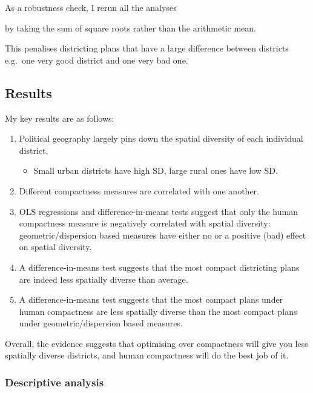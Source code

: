 \documentclass[]{article}
\providecommand{\tightlist}{%
  \setlength{\itemsep}{0pt}\setlength{\parskip}{0pt}}
\begin{document}
As a robustness check, I rerun all the analyses

by taking the sum of square roots rather than the arithmetic mean.

This penalises districting plans that have a large difference between
districts e.g.~one very good district and one very bad one.

\hypertarget{results}{%
\subsection{Results}\label{results}}

My key results are as follows:

\begin{enumerate}
\def\labelenumi{\arabic{enumi}.}
\tightlist
\item
  Political geography largely pins down the spatial diversity of each
  individual district.

  \begin{itemize}
  \tightlist
  \item
    Small urban districts have high SD, large rural ones have low SD.
  \end{itemize}
\item
  Different compactness measures are correlated with one another.
\item
  OLS regressions and difference-in-means tests suggest that only the
  human compactness measure is negatively correlated with spatial
  diversity: geometric/dispersion based measures have either no or a
  positive (bad) effect on spatial diversity.
\item
  A difference-in-means test suggests that the most compact districting
  plans are indeed less spatially diverse than average.
\item
  A difference-in-means test suggests that the most compact plans under
  human compactness are less spatially diverse than the most compact
  plans under geometric/dispersion based measures.
\end{enumerate}

Overall, the evidence suggests that optimising over compactness will
give you less spatially diverse districts, and human compactness will do
the best job of it.

\hypertarget{descriptive-analysis}{%
\subsubsection{Descriptive analysis}\label{descriptive-analysis}}
\end{document}
